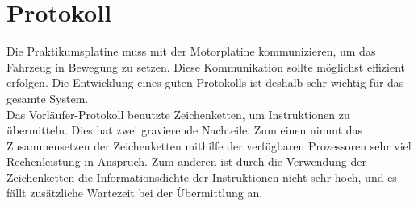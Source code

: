 \chapter{Protokoll\label{chapter_protokoll}}
Die Praktikumsplatine muss mit der Motorplatine kommunizieren, um das Fahrzeug in Bewegung zu setzen.
Diese Kommunikation sollte möglichst
effizient erfolgen. Die Entwicklung eines guten Protokolls ist deshalb
sehr wichtig für das gesamte System.\\
Das Vorläufer-Protokoll benutzte Zeichenketten, um Instruktionen zu übermitteln.
Dies hat zwei gravierende Nachteile. 
Zum einen nimmt das Zusammensetzen der Zeichenketten mithilfe der verfügbaren Prozessoren
sehr viel Rechenleistung in Anspruch.
Zum anderen ist durch die Verwendung der Zeichenketten die Informationsdichte der Instruktionen
nicht sehr hoch, und es fällt zusätzliche Wartezeit bei der Übermittlung an.

